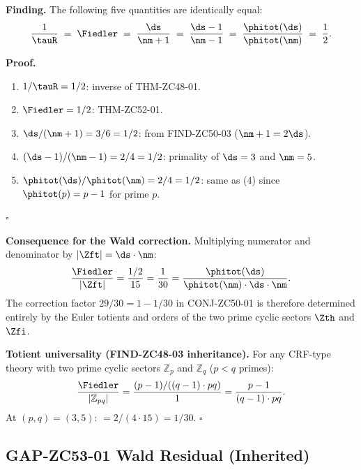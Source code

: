 \documentclass[12pt, a4paper]{article}
\begin{document}

\begin{derivedbox}[title={FIND-ZC53-01: Five-Way Identity Chain
  for the Z$_3$-Bottleneck (Exact, $R_0$)}]
\textbf{Finding.}
The following five quantities are identically equal:
\begin{equation}\label{zc53:eq:fiveway}
  \frac{1}{\tauR}
  \;=\; \Fiedler
  \;=\; \frac{\ds}{\nm+1}
  \;=\; \frac{\ds-1}{\nm-1}
  \;=\; \frac{\phitot(\ds)}{\phitot(\nm)}
  \;=\; \frac{1}{2}.
\end{equation}

\textbf{Proof.}
\begin{enumerate}[leftmargin=2em, noitemsep]
\item $1/\tauR = 1/2$: inverse of THM-ZC48-01.
\item $\Fiedler = 1/2$: THM-ZC52-01.
\item $\ds/(\nm+1) = 3/6 = 1/2$: from FIND-ZC50-03
  ($\nm+1 = 2\ds$).
\item $(\ds-1)/(\nm-1) = 2/4 = 1/2$: primality
  of $\ds=3$ and $\nm=5$.
\item $\phitot(\ds)/\phitot(\nm) = 2/4 = 1/2$: same as (4)
  since $\phitot(p)=p-1$ for prime $p$.
\end{enumerate}
\hfill$\square$

\textbf{Consequence for the Wald correction.}
Multiplying numerator and denominator by $|\Zft| = \ds\cdot\nm$:
\[
  \frac{\Fiedler}{|\Zft|}
  = \frac{1/2}{15}
  = \frac{1}{30}
  = \frac{\phitot(\ds)}{\phitot(\nm)\cdot\ds\cdot\nm}.
\]
The correction factor $29/30 = 1 - 1/30$ in CONJ-ZC50-01
is therefore determined entirely by the Euler totients and
orders of the two prime cyclic sectors $\Zth$ and $\Zfi$.

\textbf{Totient universality (FIND-ZC48-03 inheritance).}
For any CRF-type theory with two prime cyclic sectors
$\mathbb{Z}_p$ and $\mathbb{Z}_q$ ($p < q$ primes):
\[
  \frac{\Fiedler}{|\mathbb{Z}_{pq}|}
  = \frac{(p-1)/((q-1)\cdot pq)}{1}
  = \frac{p-1}{(q-1)\cdot pq}.
\]
At $(p,q)=(3,5)$: $= 2/(4\cdot 15) = 1/30$. \hfill$\square$
\end{derivedbox}

\subsection{GAP-ZC53-01 \quad Wald Residual (Inherited)}
\label{zc53:sec:gap}
\end{document}
